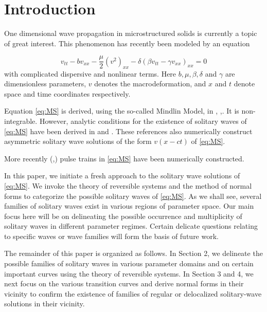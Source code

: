 \section{Introduction}

One dimensional wave propagation in microstructured solids is currently a topic of great interest.
This phenomenon has recently been modeled \cite{STE} by an equation

\begin{equation}\label{eq:MS}
v_{tt} - b v_{xx} - \frac{\mu}{2} \left( v^2 \right)_{xx} - \delta \left( \beta v_{tt} - \gamma v_{xx}\right)_{xx} = 0 
\end{equation}
with complicated dispersive and nonlinear terms. Here $b, \mu, \beta, \delta$
and $\gamma$ are dimensionless parameters, $v$ denotes the macrodeformation,
and $x$ and $t$ denote space and time coordinates respectively.

Equation \eqref{eq:MS} is derived, using the so-called Mindlin Model, in
\cite{STE}, \cite{JE1},\cite{JE2}.  It is non-integrable. However, analytic
conditions for the existence of solitary waves of \eqref{eq:MS} have been
derived in \cite{JE2} and \cite{STE}. These references also numerically
construct asymmetric solitary wave solutions of the form $ v\left(x - c t
\right)$ of \eqref{eq:MS}.

More recently (\cite{EP},\cite{EBS}) pulse trains in \eqref{eq:MS} have been
numerically constructed.

In this paper, we initiate a fresh approach to the solitary wave solutions of
\eqref{eq:MS}.  We invoke the theory of reversible systems and the method of
normal forms to categorize the possible solitary waves of \eqref{eq:MS}.  As we
shall see, several families of solitary waves exist in various regions of
parameter space. Our main focus here will be on delineating the possible
occurrence and multiplicity of solitary waves in different parameter regimes.
Certain delicate questions relating to specific waves or wave families will
form the basis of future work. 

The remainder of this paper is organized as follows. In Section 2, we delineate
the possible families of solitary waves in various parameter domains and on
certain important curves using the theory of reversible systems. In Section 3
and 4, we next focus on the various transition curves and derive normal forms
in their vicinity to confirm the existence of families of regular or
delocalized solitary-wave solutions in their vicinity.



